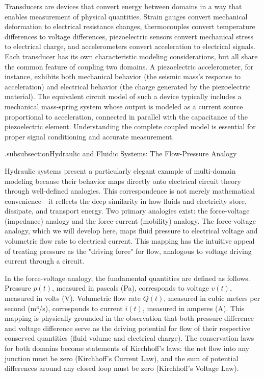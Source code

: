Transducers are devices that convert energy between domains in a way that enables measurement of physical quantities. Strain gauges convert mechanical deformation to electrical resistance changes, thermocouples convert temperature differences to voltage differences, piezoelectric sensors convert mechanical stress to electrical charge, and accelerometers convert acceleration to electrical signals. Each transducer has its own characteristic modeling considerations, but all share the common feature of coupling two domains. A piezoelectric accelerometer, for instance, exhibits both mechanical behavior (the seismic mass's response to acceleration) and electrical behavior (the charge generated by the piezoelectric material). The equivalent circuit model of such a device typically includes a mechanical mass-spring system whose output is modeled as a current source proportional to acceleration, connected in parallel with the capacitance of the piezoelectric element. Understanding the complete coupled model is essential for proper signal conditioning and accurate measurement.

.subsubsection{Hydraulic and Fluidic Systems: The Flow-Pressure Analogy}

Hydraulic systems present a particularly elegant example of multi-domain modeling because their behavior maps directly onto electrical circuit theory through well-defined analogies. This correspondence is not merely mathematical convenience—it reflects the deep similarity in how fluids and electricity store, dissipate, and transport energy. Two primary analogies exist: the force-voltage (impedance) analogy and the force-current (mobility) analogy. The force-voltage analogy, which we will develop here, maps fluid pressure to electrical voltage and volumetric flow rate to electrical current. This mapping has the intuitive appeal of treating pressure as the "driving force" for flow, analogous to voltage driving current through a circuit.

In the force-voltage analogy, the fundamental quantities are defined as follows. Pressure $p(t)$, measured in pascals (Pa), corresponds to voltage $v(t)$, measured in volts (V). Volumetric flow rate $Q(t)$, measured in cubic meters per second (m³/s), corresponds to current $i(t)$, measured in amperes (A). This mapping is physically grounded in the observation that both pressure difference and voltage difference serve as the driving potential for flow of their respective conserved quantities (fluid volume and electrical charge). The conservation laws for both domains become statements of Kirchhoff's laws: the net flow into any junction must be zero (Kirchhoff's Current Law), and the sum of potential differences around any closed loop must be zero (Kirchhoff's Voltage Law).

